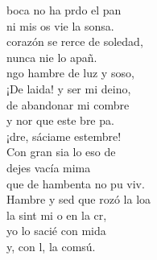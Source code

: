 \begin{cancion}%
	 boca no ha prdo el pan\\
	ni mis os vie la sonsa.\\
\jump
	 corazón se rerce de soledad,\\
	nunca nie lo apañ. \\
\jump
	ngo hambre de luz y soso,\\
	¡De laida! y ser mi deino,\\
	de abandonar mi combre\\
	y nor que este bre pa. \\
\jump
	¡dre, sáciame estembre! \\
	Con gran sia lo eso de \\
\jump
	 dejes vacía mima\\
	que de hambenta no pu viv.\\
\jump
	Hambre y sed que rozó la loa\\
	la sint mi o en la cr, \\
	yo lo sacié con mida\\
	y, con l, la comsú. \\
\end{cancion}%
